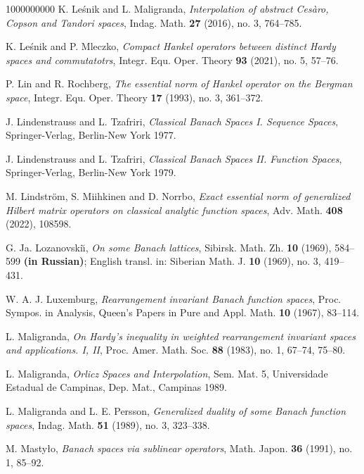 \documentclass[11pt]{amsart}
\theoremstyle{definition}
\theoremstyle{definition}
\theoremstyle{definition}
\theoremstyle{definition}
\theoremstyle{definition}
\theoremstyle{definition}
\theoremstyle{definition}
\theoremstyle{definition}
\numberwithin{equation}{section}
\numberwithin{equation}{section}
\numberwithin{equation}{section}
\theoremstyle{definition}
\theoremstyle{definition}
\theoremstyle{definition}
\theoremstyle{definition}
\theoremstyle{definition}
\theoremstyle{definition}
\begin{document}
\begin{thebibliography}{1000000000}
	 K. Le{\'s}nik and L. Maligranda, {\it Interpolation of abstract Ces{\` a}ro, Copson and Tandori spaces}, Indag. Math. {\bf 27} (2016), no. 3, 764--785.
	
	 K. Le{\' s}nik and P. Mleczko, {\it Compact Hankel operators between distinct Hardy spaces and commutatotrs}, Integr. Equ. Oper. Theory {\bf 93} (2021),
		no. 5, 57--76.
		
	 P. Lin and R. Rochberg, {\it The essential norm of Hankel operator on the Bergman space}, Integr. Equ. Oper. Theory {\bf 17} (1993), no. 3, 361--372.
		
	 J. Lindenstrauss and L. Tzafriri, \textit{Classical Banach Spaces I. Sequence Spaces}, Springer-Verlag, Berlin-New York 1977.
		
	 J. Lindenstrauss and L. Tzafriri, \textit{Classical Banach Spaces II. Function Spaces}, Springer-Verlag, Berlin-New York 1979.
	
	 M. Lindstr{\" o}m, S. Miihkinen and D. Norrbo, {\it Exact essential norm of generalized Hilbert matrix operators on classical analytic function spaces},
	Adv. Math. {\bf 408} (2022), 108598.
	
	 G. Ja. Lozanovski{\u \i}, {\it On some Banach lattices}, Sibirsk. Math. Zh. {\bf 10} (1969), 584--599 {\bf (in Russian)}; English transl. in: Siberian Math. J.
		{\bf 10} (1969), no. 3, 419--431.
		
	 W. A. J. Luxemburg, {\it Rearrangement invariant Banach function spaces}, Proc. Sympos. in Analysis, Queen's Papers in Pure and Appl. Math. {\bf 10} (1967), 83--114.
	
	 L. Maligranda, {\it On Hardy's inequality in weighted rearrangement invariant spaces and applications. I, II}, Proc. Amer. Math. Soc. {\bf 88} (1983),
		no. 1, 67--74, 75--80.
	
	 L. Maligranda, \textit{Orlicz Spaces and Interpolation}, Sem. Mat. 5, Universidade Estadual de Campinas, Dep. Mat., Campinas 1989.
	
	 L. Maligranda and L. E. Persson, {\it Generalized duality of some Banach function spaces}, Indag. Math. {\bf 51} (1989), no. 3, 323--338.
	
	 M. Masty{\l}o, {\it Banach spaces via sublinear operators}, Math. Japon. {\bf 36} (1991), no. 1, 85--92.
	

\end{thebibliography}
\end{document}
